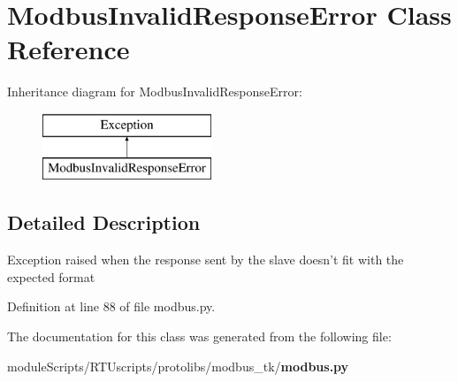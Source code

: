 \section{Modbus\+Invalid\+Response\+Error Class Reference}
\label{classprotolibs_1_1modbus__tk_1_1modbus_1_1_modbus_invalid_response_error}
Inheritance diagram for Modbus\+Invalid\+Response\+Error\+:\begin{figure}[H]
\begin{center}
\leavevmode
\includegraphics[height=2.000000cm]{classprotolibs_1_1modbus__tk_1_1modbus_1_1_modbus_invalid_response_error}
\end{center}
\end{figure}


\subsection{Detailed Description}
\begin{DoxyVerb}Exception raised when the response sent by the slave doesn't fit 
with the expected format
\end{DoxyVerb}
 

Definition at line 88 of file modbus.\+py.



The documentation for this class was generated from the following file\+:\begin{DoxyCompactItemize}
\item 
module\+Scripts/\+R\+T\+Uscripts/protolibs/modbus\+\_\+tk/{\bf modbus.\+py}\end{DoxyCompactItemize}
